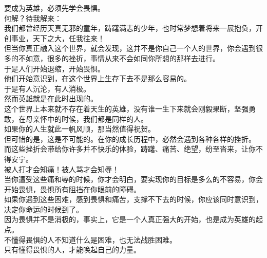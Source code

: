 \begin{multicols}{\theparacolNo}
要成为英雄，必须先学会畏惧。\\

何解？待我解来：\\

我们都曾经历天真无邪的童年，踌躇满志的少年，也时常梦想着将来一展抱负，开创事业，天下之大，任我往来！\\

但当你真正融入这个世界，就会发现，这并不是你自己一个人的世界，你会遇到很多的不如意，很多的挫折，事情从来不会如同你所想的那样去进行。\\

于是人们开始退缩，开始畏惧。\\

他们开始意识到，在这个世界上生存下去不是那么容易的。\\

于是有人沉沦，有人消极。\\

然而英雄就是在此时出现的。\\

这个世界上本来就不存在着天生的英雄，没有谁一生下来就会刚毅果断，坚强勇敢，在母亲怀中的时候，我们都是同样的人。\\

如果你的人生就此一帆风顺，那当然值得祝贺。\\

但可惜的是，这是不可能的。在你的成长历程中，必然会遇到各种各样的挫折。\\

而这些挫折会带给你许多并不快乐的体验，踌躇、痛苦、绝望，纷至沓来，让你不得安宁。\\

被人打才会知痛！被人骂才会知辱！\\

当你遭受这些痛和辱的时候，你才会明白，要实现你的目标是多么的不容易，你会开始畏惧，畏惧所有阻挡在你眼前的障碍。\\

如果你遇到这些困难，感到畏惧和痛苦，支撑不下去的时候，你应该同时意识到，决定你命运的时候到了。\\

因为畏惧并不是消极的，事实上，它是一个人真正强大的开始，也是成为英雄的起点。\\

不懂得畏惧的人不知道什么是困难，也无法战胜困难。\\

只有懂得畏惧的人，才能唤起自己的力量。\\


\end{multicols}
